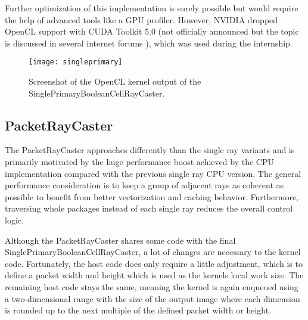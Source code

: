 Further optimization of this implementation is surely possible but would require the help of advanced tools like a GPU profiler. However, NVIDIA dropped OpenCL support with CUDA Toolkit 5.0 (not officially announced but the topic is discussed in several internet forums \cite{dropped_opencl_support}), which was used during the internship.


\begin{figure}
\centering
\texttt{[image: singleprimary]}
\caption{Screenshot of the OpenCL kernel output of the SinglePrimaryBooleanCellRayCaster.}
\label{fig:singleprimary}
\end{figure}

\subsection{PacketRayCaster}

The PacketRayCaster approaches differently than the single ray variants and is primarily motivated by the huge performance boost achieved by the CPU implementation compared with the previous single ray CPU version. The general performance consideration is to keep a group of adjacent rays as coherent as possible to benefit from better vectorization and caching behavior. Furthermore, traversing whole packages instead of each single ray reduces the overall control logic.

Although the PacketRayCaster shares some code with the final SinglePrimaryBooleanCellRayCaster, a lot of changes are necessary to the kernel code. Fortunately, the host code does only require a little adjustment, which is to define a packet width and height which is used as the kernels local work size. The remaining host code stays the same, meaning the kernel is again enqueued using a two-dimensional range with the size of the output image where each dimension is rounded up to the next multiple of the defined packet width or height.

